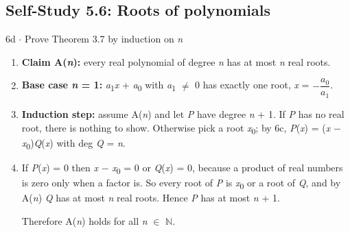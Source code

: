 \documentclass[11pt]{article}
\begin{document}
\begin{keepsection}\subsection{Self-Study 5.6: Roots of polynomials}

\begin{workedbox}{6d \ensuremath{\cdot} Prove Theorem 3.7 by induction on \textit{n}}
\begin{enumerate}
\item \textbf{Claim A(\textit{n}):} every real polynomial of degree \textit{n} has at most \textit{n} real roots.
\item \textbf{Base case \textit{n} = 1:} \textit{a}\textsubscript{1}\textit{x} + \textit{a}\textsubscript{0} with \textit{a}\textsubscript{1} \ensuremath{\neq} 0 has exactly one root, \textit{x} = \ensuremath{-}{\small\ensuremath{\dfrac{{a}_{0}}{{a}_{1}}}}.
\item \textbf{Induction step:} assume A(\textit{n}) and let \textit{P} have degree \textit{n} + 1. If \textit{P} has no real root, there is nothing to show. Otherwise pick a root \textit{x}\textsubscript{0}; by 6c, \textit{P}(\textit{x}) = (\textit{x} \ensuremath{-} \textit{x}\textsubscript{0})\textit{Q}(\textit{x}) with deg \textit{Q} = \textit{n}.
\item {}
If \textit{P}(\textit{x}) = 0 then \textit{x} \ensuremath{-} \textit{x}\textsubscript{0} = 0 or \textit{Q}(\textit{x}) = 0, because a product of real numbers is zero only when a factor is. So every root of \textit{P} is \textit{x}\textsubscript{0} or a root of \textit{Q}, and by A(\textit{n}) \textit{Q} has at most \textit{n} real roots. Hence \textit{P} has at most \textit{n} + 1.

Therefore A(\textit{n}) holds for all \textit{n} \ensuremath{\in} \ensuremath{\mathbb{N}}.
\end{enumerate}
\end{workedbox}

\end{keepsection}
\end{document}
